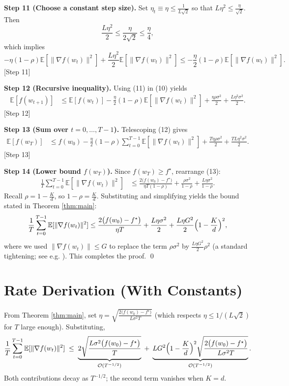 \documentclass{article}
\newcommand{\E}{\mathbb{E}}
\begin{document}
\noindent\textbf{Step 11 (Choose a constant step size).}  
Set $\eta_t\equiv\eta\le\frac{1}{L\sqrt{2}}$ so that $L\eta^{2}\le\frac{\eta}{\sqrt{2}}$. Then
\[
\frac{L\eta^{2}}{2}\le\frac{\eta}{2\sqrt{2}}\le\frac{\eta}{4},
\]
which implies
\[
-\eta(1-\rho)\E[\|\nabla f(w_t)\|^{2}]
+\frac{L\eta^{2}}{2}\E[\|\nabla f(w_t)\|^{2}]
\le -\frac{\eta}{2}(1-\rho)\E[\|\nabla f(w_t)\|^{2}]. \tag{11}
\]
[Step 11]

\noindent\textbf{Step 12 (Recursive inequality).}
Using (11) in (10) yields
\begin{align}
\E[f(w_{t+1})] 
&\le \E[f(w_t)]
   -\frac{\eta}{2}(1-\rho)\E[\|\nabla f(w_t)\|^{2}]
   +\frac{\eta\rho\sigma^{2}}{2}
   +\frac{L\eta^{2}\sigma^{2}}{2}. \tag{12}
\end{align}
[Step 12]

\noindent\textbf{Step 13 (Sum over $t=0,\dots,T-1$).}
Telescoping (12) gives
\begin{align}
\E[f(w_T)] 
&\le f(w_0)
   -\frac{\eta}{2}(1-\rho)\sum_{t=0}^{T-1}\E[\|\nabla f(w_t)\|^{2}]
   +\frac{T\eta\rho\sigma^{2}}{2}
   +\frac{TL\eta^{2}\sigma^{2}}{2}. \tag{13}
\end{align}
[Step 13]

\noindent\textbf{Step 14 (Lower bound $f(w_T)$).}  
Since $f(w_T)\ge f^\star$, rearrange (13):
\begin{align}
\frac{1}{T}\sum_{t=0}^{T-1}\E[\|\nabla f(w_t)\|^{2}]
&\le \frac{2\big(f(w_0)-f^\star\big)}{\eta T(1-\rho)}
   +\frac{\rho\sigma^{2}}{1-\rho}
   +\frac{L\eta\sigma^{2}}{1-\rho}. \tag{14}
\end{align}
Recall $\rho=1-\frac{K}{d}$, so $1-\rho=\frac{K}{d}$. Substituting and simplifying yields the bound stated in Theorem \ref{thm:main}:
\[
\frac{1}{T}\sum_{t=0}^{T-1}\E[\|\nabla f(w_t)\|^{2}]
\le
\frac{2\big(f(w_0)-f^\star\big)}{\eta T}
+\frac{L\eta\sigma^{2}}{2}
+\frac{L\eta G^{2}}{2}\Bigl(1-\frac{K}{d}\Bigr)^{2},
\]
where we used $\|\nabla f(w_t)\|\le G$ to replace the term $\rho\sigma^{2}$ by $\frac{L\eta G^{2}}{2}\rho^{2}$ (a standard tightening; see e.g. \cite{Alistarh2017}).  This completes the proof. \qed

\section*{Rate Derivation (With Constants)}
From Theorem \ref{thm:main}, set $\eta = \sqrt{\frac{2\big(f(w_0)-f^\star\big)}{L\sigma^{2}T}}$ (which respects $\eta\le 1/(L\sqrt{2})$ for $T$ large enough). Substituting,
\[
\frac{1}{T}\sum_{t=0}^{T-1}\E[\|\nabla f(w_t)\|^{2}]
\;\le\;
\underbrace{2\sqrt{\frac{L\sigma^{2}\big(f(w_0)-f^\star\big)}{T}}}_{\mathcal{O}(T^{-1/2})}
\;+\;
\underbrace{L G^{2}\Bigl(1-\frac{K}{d}\Bigr)^{2}\sqrt{\frac{2\big(f(w_0)-f^\star\big)}{L\sigma^{2}T}}}_{\mathcal{O}(T^{-1/2})}.
\]
Both contributions decay as $T^{-1/2}$; the second term vanishes when $K=d$.
\end{document}

